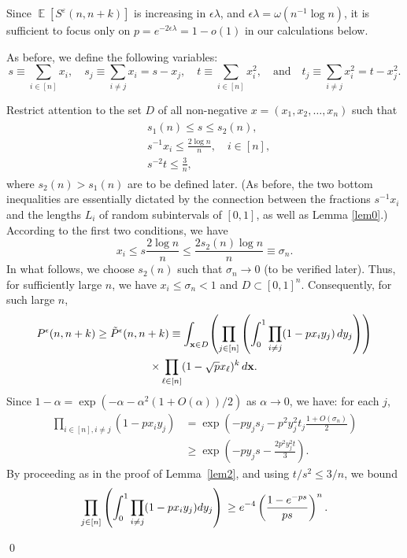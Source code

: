 \documentclass[10pt,a4paper]{amsart}
\newcommand{\E}{\operatorname{\mathbb{E}}}
\def\eps{\varepsilon}
\newenvironment{proof}{\noindent{\bf Proof:}}{\qed}
\begin{document}
\begin{proof}
Since $\E[S^{\eps}(n,n+k)]$ is increasing in $\epsilon\lambda$, and $\epsilon\lambda=\omega(n^{-1}\log n)$, it is sufficient to focus only on $p=e^{-2\epsilon\lambda}=1-o(1)$ in our calculations below.

As before, we define the following variables:
\begin{equation*}
    s \equiv \sum_{i \in [n]}x_i,\quad s_j \equiv \sum_{i\neq j}x_i=s-x_j, \quad t \equiv \sum_{i \in [n]}x_i^2 , \quad \text{and} \quad t_j\equiv \sum_{i\neq j}x_i^2=t-x_j^2.
\end{equation*}

Restrict attention to the set $D$ of all non-negative $x=(x_1,x_2,\ldots,x_n)$ such that
\begin{align}
\label{set_D_imbalance}
\begin{split}
&s_1(n)  \leq s \leq s_2(n), \\
&s^{-1} x_i \leq \frac{2\log n}{n},\quad i \in [n],\\
&s^{-2} t \leq \frac{3}{n},
\end{split}
\end{align}
where $s_2(n)>s_1(n)$ are to be defined later. (As before, the two bottom inequalities are essentially dictated by the connection between the fractions $s^{-1}x_i$ and the lengths $L_i$ of random subintervals 
of $[0,1]$, as well as Lemma \ref{lem0}.) According to the first two conditions, we have
\begin{equation*}
    x_i \leq s\frac{2\log n}{n} \leq \frac{2s_2(n)\log n}{n} \equiv \sigma_n.
\end{equation*}
In what follows, we choose $s_2(n)$ such that $\sigma_n \to 0$ (to be verified later). Thus, for sufficiently large $n$, we have $x_i\leq\sigma_n<1$ and $D \subset [0,1]^n$. Consequently, for such large $n$,
\begin{multline*}
P^\epsilon(n,n+k)\geq \tilde{P}^\epsilon(n,n+k) \equiv  \int_{\bold x \in D}\!\left(\prod_{j \in [n]}\left(\int_0^1 \prod_{i \neq j} (1-px_iy_j)\,dy_j\right)\right)\\
\times\prod_{\ell\in [n]}(1-\sqrt{p}x_{\ell})^k\,d\bold x.
\end{multline*}
Since $1-\alpha=\exp(-\alpha-\alpha^2(1+O(\alpha))/2)$ as $\alpha \to 0$, we have: for each $j$,
\begin{align*}
    \prod_{i \in[n], i\neq j} \left(1-px_iy_j\right) 
    &= \exp\left(-py_js_j-p^2y^2_jt_j\frac{1+O\left(\sigma_n\right)}{2}\right)\\
    &\geq \exp\left(-py_js-\frac{2p^2y^2_jt}{3}\right).
\end{align*}
By proceeding as in the proof of Lemma~\ref{lem2}, and using $t/s^2\leq3/n$, we bound
\begin{equation*}
\prod_{j \in [n]} \left( \int_0^1 \prod_{i \neq j} (1 - p x_i y_j) dy_j \right) \\
\geq e^{-4} \left(\frac{1 - e^{-ps}}{ps} \right)^n. 
\end{equation*}


\end{proof}
\end{document}
